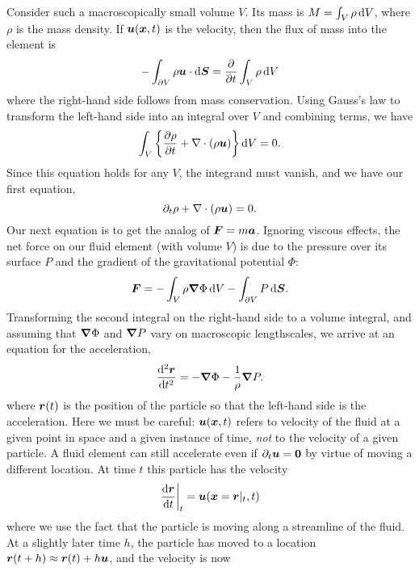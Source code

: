 Consider such a macroscopically small volume $V$. Its mass is $M = \int_{V} \rho\,\mathrm{d} V$, where $\rho$ is the mass density.  If $\boldsymbol{u}(\boldsymbol{x},t)$ is the velocity, then the flux of mass into the element is
\begin{equation}
-\int_{\partial V}\rho\boldsymbol{u}\cdot \mathrm{d} \boldsymbol{S} = \frac{\partial}{\partial t}\int_{V}\rho\,\mathrm{d} V
\end{equation}
where the right-hand side follows from mass conservation.  Using Gauss's law to transform the left-hand side into an integral over $V$ and combining terms, we have
\begin{equation}
\int_{V} \left\{ \frac{\partial\rho}{\partial t} + \nabla \cdot(\rho\boldsymbol{u})\right\}\mathrm{d} V = 0.
\end{equation}
Since this equation holds for any $V$, the integrand must vanish, and we have our first equation,
\begin{equation}\label{e.mass-conv}
\partial_{t}\rho + \nabla \cdot(\rho\boldsymbol{u}) = 0.
\end{equation}
Our next equation is to get the analog of $\boldsymbol{F} = m\boldsymbol{a}$.  Ignoring viscous effects, the net force on our fluid element (with volume $V$) is due to the pressure over its surface $P$ and the gradient of the gravitational potential $\Phi$:
\begin{equation}\label{e.force-density}
\boldsymbol{F} =  -\int_{V}\rho\boldsymbol{\nabla}\Phi\,\mathrm{d} V - \int_{\partial V}P \,\mathrm{d} \boldsymbol{S}.
\end{equation}
Transforming the second integral on the right-hand side to a volume integral, and assuming that $\boldsymbol{\nabla} \Phi$ and $\boldsymbol{\nabla} P$ vary on macroscopic lengthscales, we arrive at an equation for the acceleration,
\begin{equation}\label{e.accel}
\frac{\mathrm{d}^{2}\boldsymbol{r}}{\mathrm{d} t^{2}} = -\boldsymbol{\nabla}\Phi - \frac{1}{\rho}\boldsymbol{\nabla} P.
\end{equation}
where $\boldsymbol{r}(t)$ is the position of the particle so that the left-hand side is the acceleration.
Here we must be careful: $\boldsymbol{u}(\boldsymbol{x},t)$ refers to velocity of the fluid at a given point in space and a given instance of time, \emph{not} to the velocity of a given particle.  A fluid element can still accelerate even if $\partial_{t}\boldsymbol{u} = \boldsymbol{0}$ by virtue of moving a different location. At time $t$ this particle has the velocity
\begin{equation}\label{e.rdot}
\left.\frac{\mathrm{d}\boldsymbol{r}}{\mathrm{d} t}\right|_{t} = \boldsymbol{u}(\boldsymbol{x} = \boldsymbol{r}|_{t},t)
\end{equation}
where we use the fact that the particle is moving along a streamline of the fluid. At a slightly later time $h$, the particle has moved to a location $\boldsymbol{r}(t + h) \approx \boldsymbol{r}(t) + h\boldsymbol{u}$, and the velocity is now
